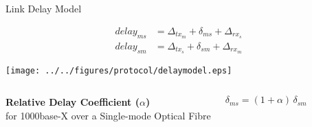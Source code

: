 \documentclass[compress,red]{beamer}
\begin{document}
\subsection{}
\begin{frame}{Link Delay Model}

  \begin{align}
    \nonumber delay_{ms} &= \Delta_{tx_m} + \delta_{ms} + \Delta_{rx_s} \\
    \nonumber delay_{sm} &= \Delta_{tx_s} + \delta_{sm} + \Delta_{rx_m}
  \end{align}

   \vspace{0.2cm}

  \begin{center}
  \texttt{[image: ../../figures/protocol/delaymodel.eps]}
  \end{center}

\begin{columns}[c]
  \column{2.8in}

    \begin{center}
      \textbf{Relative Delay Coefficient ($\alpha$)} \\
      for 1000base-X over a Single-mode Optical Fibre
    \end{center}

  \column{1.5in}
    \begin{center}
      \begin{equation}
      \nonumber \delta_{ms} = (1 + \alpha) \, \delta_{sm}
      \end{equation}
    \end{center}
    \vspace{0.5cm}
\end{columns}
  

\end{frame}
\end{document}
